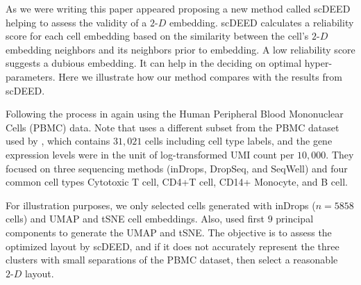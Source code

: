 \documentclass[
  12pt]{article}
\newcommand\gD{$2\text{-}D$}
\begin{document}
As we were writing this paper \citet{xia2023} appeared proposing a new
method called scDEED helping to assess the validity of a \gD{}
embedding. scDEED calculates a reliability score for each cell embedding
based on the similarity between the cell's \gD{} embedding neighbors and
its neighbors prior to embedding. A low reliability score suggests a
dubious embedding. It can help in the deciding on optimal
hyper-parameters. Here we illustrate how our method compares with the
results from scDEED.

Following the process in \citet{xia2023} again using the Human
Peripheral Blood Mononuclear Cells (PBMC) data. Note that
\citet{xia2023} uses a different subset from the PBMC dataset used by
\citet{chen2024}, which contains \(31,021\) cells including cell type
labels, and the gene expression levels were in the unit of
log-transformed UMI count per \(10,000\). They focused on three
sequencing methods (inDrops, DropSeq, and SeqWell) and four common cell
types Cytotoxic T cell, CD4+T cell, CD14+ Monocyte, and B cell.

For illustration purposes, we only selected cells generated with inDrops
(\(n=5858\) cells) and UMAP and tSNE cell embeddings. Also,
\citet{xia2023} used first \(9\) principal components to generate the
UMAP and tSNE. The objective is to assess the optimized layout by
scDEED, and if it does not accurately represent the three clusters with
small separations of the PBMC dataset, then select a reasonable \gD{}
layout.
\end{document}
